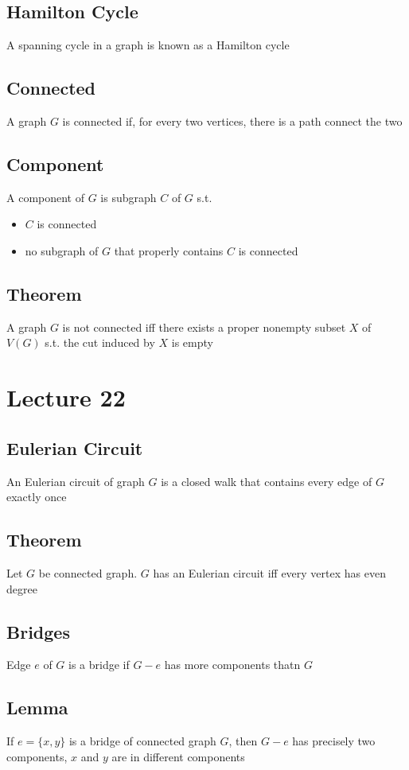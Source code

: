 \documentclass[11pt]{article}
\begin{document}
\subsection{Hamilton Cycle}
A spanning cycle in a graph is known as a Hamilton cycle
\subsection{Connected}
A graph $G$ is connected if, for every two vertices, there is a path connect the two 
\subsection{Component}
A component of $G$ is subgraph $C$ of $G$ s.t.
\begin{itemize}
  \item $C$ is connected 
  \item no subgraph of $G$ that properly contains $C$ is connected
\end{itemize}
\subsection{Theorem}
A graph $G$ is not connected iff there exists a proper nonempty subset $X$ of $V(G)$ s.t. the cut induced by $X$ is empty 

\section{Lecture 22}
\subsection{Eulerian Circuit}
An Eulerian circuit of graph $G$ is a closed walk that contains every edge of $G$ exactly once
\subsection{Theorem}
Let $G$ be connected graph. $G$ has an Eulerian circuit iff every vertex has even degree
\subsection{Bridges}
Edge $e$ of $G$ is a bridge if $G-e$ has more components thatn $G$
\subsection{Lemma}
If $e=\{x,y\}$ is a bridge of connected graph $G$, then $G-e$ has precisely two components, $x$ and $y$ are in different components 
\end{document}
